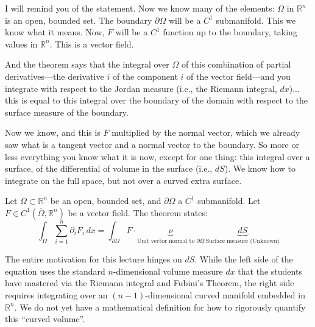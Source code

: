 \begin{spoken-clean}[00:00:58 - 00:01:55]
I will remind you of the statement. Now we know many of the elements: $\Omega$ in $\mathbb{R}^n$ is an open, bounded set. The boundary $\partial \Omega$ will be a $C^1$ submanifold. This we know what it means. Now, $F$ will be a $C^1$ function up to the boundary, taking values in $\mathbb{R}^n$. This is a vector field. 

And the theorem says that the integral over $\Omega$ of this combination of partial derivatives—the derivative $i$ of the component $i$ of the vector field—and you integrate with respect to the Jordan measure (i.e., the Riemann integral, $dx$)... this is equal to this integral over the boundary of the domain with respect to the surface measure of the boundary.
\end{spoken-clean}

\begin{spoken-clean}[00:01:55 - 00:02:40]
Now we know, and this is $F$ multiplied by the normal vector, which we already saw what is a tangent vector and a normal vector to the boundary. So more or less everything you know what it is now, except for one thing: this integral over a surface, of the differential of volume in the surface (i.e., $dS$). We know how to integrate on the full space, but not over a curved extra surface.
\end{spoken-clean}

\begin{orange-formula}
\begin{theorem}
Let $\Omega \subset \mathbb{R}^n$ be an open, bounded set, and $\partial \Omega$ a $C^1$ submanifold. Let $F \in C^1(\overline{\Omega}, \mathbb{R}^n)$ be a vector field. The theorem states:
\begin{equation} \label{eq:divergence}
\int_\Omega \sum_{i=1}^n \partial_i F_i \, dx = \int_{\partial \Omega} F \cdot \underbrace{\nu}_{\text{Unit vector normal to } \partial \Omega} \, \underbrace{dS}_{\text{Surface measure (Unknown)}}
\end{equation}
\end{theorem}
\end{orange-formula}

\begin{redundant-explanation}
The entire motivation for this lecture hinges on $dS$. While the left side of the equation uses the standard $n$-dimensional volume measure $dx$ that the students have mastered via the Riemann integral and Fubini's Theorem, the right side requires integrating over an $(n-1)$-dimensional curved manifold embedded in $\mathbb{R}^n$. We do not yet have a mathematical definition for how to rigorously quantify this ``curved volume''.
\end{redundant-explanation}

